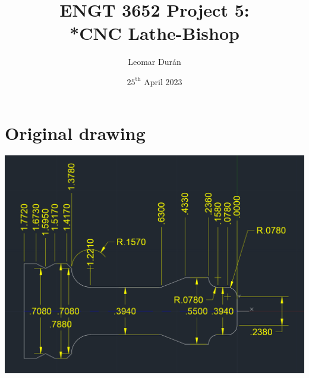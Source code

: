 \documentclass{report}
\title{ENGT 3652 Project 5:\\*CNC Lathe-Bishop}
\author{Leomar Dur\'an}
\date{${25}^{\text{th}}$ April 2023}
\begin{document}
\maketitle

\chapter{Original drawing}
\includegraphics[width=\textwidth]{Bishop - The path_pptx/ppt/media/image1.png}

\addtocounter{chapter}{1}


\addtocounter{chapter}{1}

\end{document}
